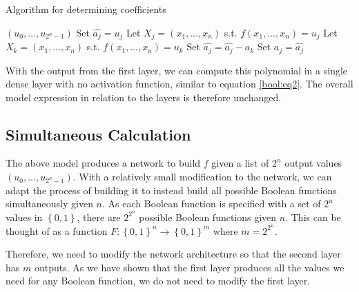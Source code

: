 \documentclass{somasmsc}
\begin{document}
\begin{algorithm}
\caption{Algorithm for determining coefficients}\label{bool:alg}
\begin{algorithmic}
\Require $\left(u_0, \dots, u_{2^n-1}\right)$
  \State Set $\hat{a_j} = u_j$
  \State Let $X_j = \left(x_1, \dots, x_n\right)$ s.t. $f(x_1, \dots, x_n) = u_j$
    \State Let $X_k = \left(x_1, \dots, x_n\right)$ s.t. $f(x_1, \dots, x_n) = u_k$
      \State Set $\hat{a_j} = \hat{a_j} - a_k$
    \EndIf
  \EndFor
  \State Set $a_j = \hat{a_j}$
\EndFor
\State {}
\end{algorithmic}
\end{algorithm}

With the output from the first layer, we can compute this polynomial in a single dense layer with no activation function, similar to equation \ref{bool:eq2}. The overall model expression in relation to the layers is therefore unchanged.


\subsection{Simultaneous Calculation}\label{bool:sim}

The above model produces a network to build $f$ given a list of $2^n$ output values $\left(u_0, ..., u_{2^n-1}\right)$. With a relatively small modification to the network, we can adapt the process of building it to instead build all possible Boolean functions simultaneously given $n$. As each Boolean function is specified with a set of $2^n$ values in $\left\{0, 1\right\}$, there are $2^{2^n}$ possible Boolean functions given $n$. This can be thought of as a function $F : \left\{0, 1\right\}^n \rightarrow \left\{0, 1\right\}^m$ where $m=2^{2^n}$.

Therefore, we need to modify the network architecture so that the second layer has $m$ outputs. As we have shown that the first layer produces all the values we need for any Boolean function, we do not need to modify the first layer.
\end{document}
